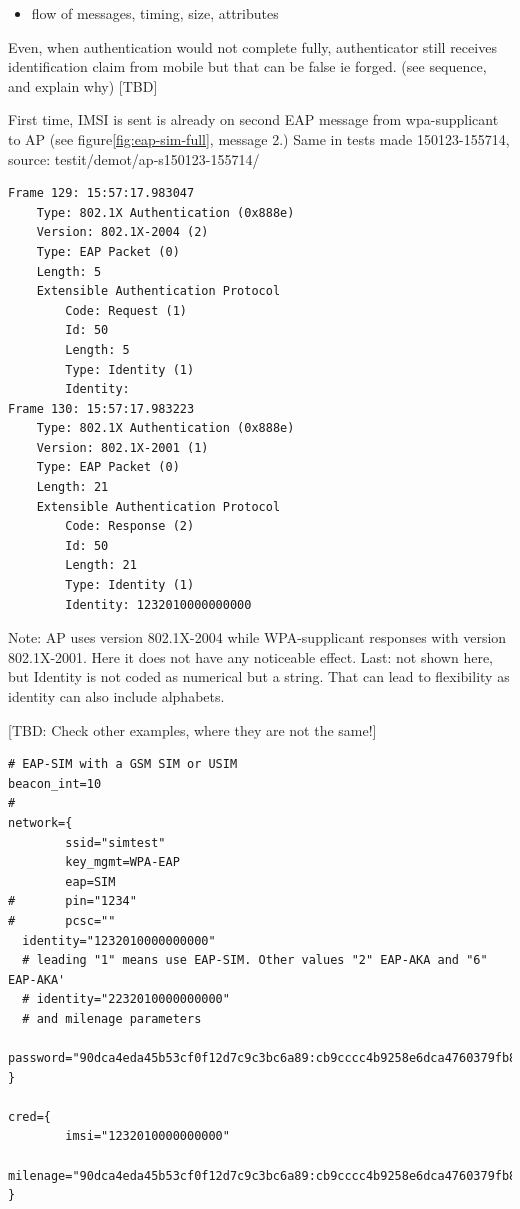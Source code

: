 \documentclass[12pt,a4paper,english]{tutthesis}
\begin{document}
\begin{otherlanguage}{english}
\begin{itemize}
\item flow of messages,  timing,  size, attributes
\end{itemize}

Even, when authentication would not complete fully, authenticator
still receives identification claim from mobile but that can be false
ie forged.  
(see sequence, and explain why) [TBD]

First time, IMSI is sent is already on second EAP message from 
wpa-supplicant to AP (see figure\ref{fig:eap-sim-full}, message 2.)
Same in tests made 150123-155714, source: testit/demot/ap-s150123-155714/
\begin{verbatim}
Frame 129: 15:57:17.983047
    Type: 802.1X Authentication (0x888e)
    Version: 802.1X-2004 (2)
    Type: EAP Packet (0)
    Length: 5
    Extensible Authentication Protocol
        Code: Request (1)
        Id: 50
        Length: 5
        Type: Identity (1)
        Identity: 
Frame 130: 15:57:17.983223
    Type: 802.1X Authentication (0x888e)
    Version: 802.1X-2001 (1)
    Type: EAP Packet (0)
    Length: 21
    Extensible Authentication Protocol
        Code: Response (2)
        Id: 50
        Length: 21
        Type: Identity (1)
        Identity: 1232010000000000
\end{verbatim}

Note: AP uses version 802.1X-2004 while WPA-supplicant responses with
version 802.1X-2001. Here it does not have any noticeable effect.
Last: not shown here, but Identity is not coded as numerical but a string.
That can lead to flexibility as identity can also include alphabets.

[TBD: Check other examples, where  they are not the same!]


\begin{verbatim}
# EAP-SIM with a GSM SIM or USIM
beacon_int=10
#
network={
        ssid="simtest"
        key_mgmt=WPA-EAP
        eap=SIM
#       pin="1234"
#       pcsc=""
  identity="1232010000000000"
  # leading "1" means use EAP-SIM. Other values "2" EAP-AKA and "6" EAP-AKA'
  # identity="2232010000000000"
  # and milenage parameters
  password="90dca4eda45b53cf0f12d7c9c3bc6a89:cb9cccc4b9258e6dca4760379fb82581"
}

cred={
        imsi="1232010000000000"
        milenage="90dca4eda45b53cf0f12d7c9c3bc6a89:cb9cccc4b9258e6dca4760379fb82581"
}
\end{verbatim}


\end{otherlanguage}
\end{document}

